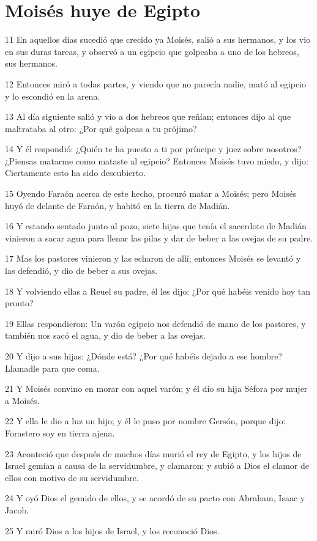\section*{Moisés huye de Egipto}

\par 11 En aquellos días sucedió que crecido ya Moisés, salió a sus hermanos, y los vio en sus duras tareas, y observó a un egipcio que golpeaba a uno de los hebreos, sus hermanos.
\par 12 Entonces miró a todas partes, y viendo que no parecía nadie, mató al egipcio y lo escondió en la arena.
\par 13 Al día siguiente salió y vio a dos hebreos que reñían; entonces dijo al que maltrataba al otro: ¿Por qué golpeas a tu prójimo?
\par 14 Y él respondió: ¿Quién te ha puesto a ti por príncipe y juez sobre nosotros? ¿Piensas matarme como mataste al egipcio? Entonces Moisés tuvo miedo, y dijo: Ciertamente esto ha sido descubierto.
\par 15 Oyendo Faraón acerca de este hecho, procuró matar a Moisés; pero Moisés huyó de delante de Faraón, y habitó en la tierra de Madián.
\par 16 Y estando sentado junto al pozo, siete hijas que tenía el sacerdote de Madián vinieron a sacar agua para llenar las pilas y dar de beber a las ovejas de su padre.
\par 17 Mas los pastores vinieron y las echaron de allí; entonces Moisés se levantó y las defendió, y dio de beber a sus ovejas.
\par 18 Y volviendo ellas a Reuel su padre, él les dijo: ¿Por qué habéis venido hoy tan pronto?
\par 19 Ellas respondieron: Un varón egipcio nos defendió de mano de los pastores, y también nos sacó el agua, y dio de beber a las ovejas.
\par 20 Y dijo a sus hijas: ¿Dónde está? ¿Por qué habéis dejado a ese hombre? Llamadle para que coma.
\par 21 Y Moisés convino en morar con aquel varón; y él dio su hija Séfora por mujer a Moisés.
\par 22 Y ella le dio a luz un hijo; y él le puso por nombre Gersón, porque dijo: Forastero soy en tierra ajena.
\par 23 Aconteció que después de muchos días murió el rey de Egipto, y los hijos de Israel gemían a causa de la servidumbre, y clamaron; y subió a Dios el clamor de ellos con motivo de su servidumbre.
\par 24 Y oyó Dios el gemido de ellos, y se acordó de su pacto con Abraham, Isaac y Jacob.
\par 25 Y miró Dios a los hijos de Israel, y los reconoció Dios.

